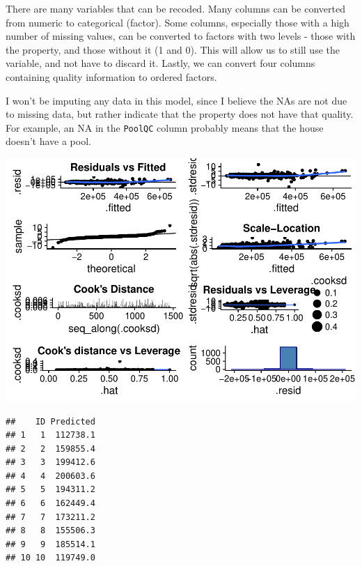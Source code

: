 \documentclass[]{article}
\begin{document}
There are many variables that can be recoded. Many columns can be
converted from numeric to categorical (factor). Some columns, especially
those with a high number of missing values, can be converted to factors
with two levels - those with the property, and those without it (1 and
0). This will allow us to still use the variable, and not have to
discard it. Lastly, we can convert four columns containing quality
information to ordered factors.

I won't be imputing any data in this model, since I believe the NAs are
not due to missing data, but rather indicate that the property does not
have that quality. For example, an NA in the \texttt{PoolQC} column
probably means that the house doesn't have a pool.

\includegraphics{DATA_605_Final_Exam_files/figure-latex/model-plots-1.pdf}

\begin{verbatim}
##    ID Predicted
## 1   1  112738.1
## 2   2  159855.4
## 3   3  199412.6
## 4   4  200603.6
## 5   5  194311.2
## 6   6  162449.4
## 7   7  173211.2
## 8   8  155506.3
## 9   9  185514.1
## 10 10  119749.0
\end{verbatim}
\end{document}

